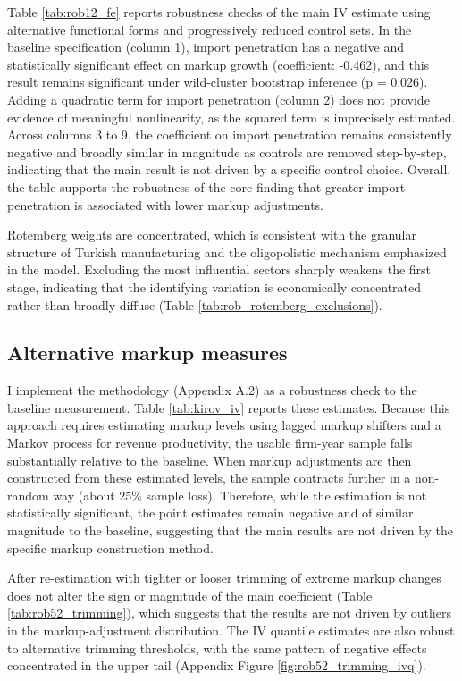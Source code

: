 \documentclass[12pt]{article}
\begin{document}
Table \ref{tab:rob12_fe} reports robustness checks of the main IV estimate using alternative functional forms and progressively reduced control sets. In the baseline specification (column 1), import penetration has a negative and statistically significant effect on markup growth (coefficient: -0.462), and this result remains significant under wild-cluster bootstrap inference (p = 0.026). Adding a quadratic term for import penetration (column 2) does not provide evidence of meaningful nonlinearity, as the squared term is imprecisely estimated. Across columns 3 to 9, the coefficient on import penetration remains consistently negative and broadly similar in magnitude as controls are removed step-by-step, indicating that the main result is not driven by a specific control choice. Overall, the table supports the robustness of the core finding that greater import penetration is associated with lower markup adjustments.

Rotemberg weights are concentrated, which is consistent with the granular structure of Turkish manufacturing and the oligopolistic mechanism emphasized in the model. Excluding the most influential sectors sharply weakens the first stage, indicating that the identifying variation is economically concentrated rather than broadly diffuse (Table \ref{tab:rob_rotemberg_exclusions}).


\subsection{Alternative markup measures}
I implement the \textcite{kirovMeasuringMarkupsRevenue2026} methodology (Appendix A.2) as a robustness check to the baseline measurement. Table \ref{tab:kirov_iv} reports these estimates. Because this approach requires estimating markup levels using lagged markup shifters and a Markov process for revenue productivity, the usable firm-year sample falls substantially relative to the baseline. When markup adjustments are then constructed from these estimated levels, the sample contracts further in a non-random way (about 25\% sample loss). Therefore, while the estimation is not statistically significant, the point estimates remain negative and of similar magnitude to the baseline, suggesting that the main results are not driven by the specific markup construction method. 

After re-estimation with tighter or looser trimming of extreme markup changes does not alter the sign or magnitude of the main coefficient (Table \ref{tab:rob52_trimming}), which suggests that the results are not driven by outliers in the markup-adjustment distribution. The IV quantile estimates are also robust to alternative trimming thresholds, with the same pattern of negative effects concentrated in the upper tail (Appendix Figure \ref{fig:rob52_trimming_ivq}).
\end{document}
